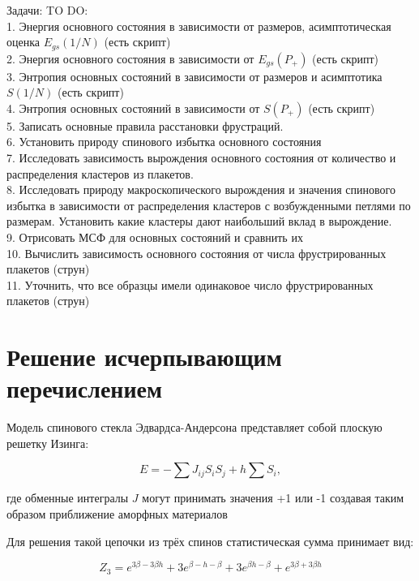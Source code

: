 \documentclass[utf8, babel, sor, jor, amsmath, amssymb, reprint]{elsarticle} %
\begin{document}
Задачи:
TO DO: \\
1. Энергия основного состояния в зависимости от размеров, асимптотическая оценка $E_{gs}(1/N)$ (есть скрипт)\\
2. Энергия основного состояния в зависимости от $E_{gs}(P_+)$  (есть скрипт)\\
3. Энтропия основных состояний в зависимости от размеров и асимптотика $S(1/N)$  (есть скрипт)\\
4. Энтропия основных состояний в зависимости от  $S(P_+)$   (есть скрипт)\\
5. Записать основные правила расстановки фрустраций.\\
6. Установить природу спинового избытка основного состояния \\
7. Исследовать зависимость вырождения основного состояния от количество и распределения кластеров из плакетов.\\
8. Исследовать природу макроскопического вырождения и значения спинового избытка в зависимости от распределения кластеров с возбужденными петлями по размерам. Установить какие кластеры дают наибольший вклад в вырождение. \\
9. Отрисовать МСФ для основных состояний и сравнить их \\
10. Вычислить зависимость основного состояния от числа фрустрированных плакетов (струн)\\
11. Уточнить, что все образцы имели одинаковое число фрустрированных плакетов (струн) 


\section{Решение исчерпывающим перечислением}

Модель спинового стекла Эдвардса-Андерсона представляет собой плоскую решетку Изинга:

\begin{equation}
	E = -\sum J_{ij} S_i S_j + h \sum S_i,
	\label{eq:ising_energy}
\end{equation}

 где обменные интегралы $J$ могут принимать значения +1 или -1 создавая таким образом приближение аморфных материалов

Для решения такой цепочки из трёх спинов статистическая сумма принимает вид:

\begin{equation}
	Z_3 = e^{3\beta - 3\beta h} + 3e^{\beta - h - \beta} + 3e^{\beta h - \beta} + e^{3\beta + 3\beta h}
	\label{eq:stat_3}
\end{equation}
\end{document}
